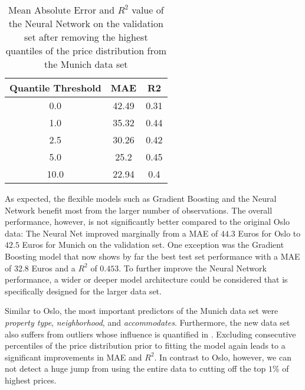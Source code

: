\begin{table}[t]
  \centering
  \begin{tabular}{@{}ccc@{}}
    \toprule
    Quantile Threshold & MAE   & R2   \\ \midrule
    0.0                & 42.49 & 0.31 \\
    1.0                & 35.32 & 0.44 \\
    2.5                & 30.26 & 0.42 \\
    5.0                & 25.2  & 0.45 \\
    10.0               & 22.94 & 0.4  \\ \bottomrule
  \end{tabular}
  \caption{Mean Absolute Error and $R^2$ value of the Neural Network on the validation set after removing the highest quantiles of the price distribution from the Munich data set}
  \label{tab:munich-outliers}
\end{table}

As expected, the flexible models such as Gradient Boosting and the Neural Network benefit most from the larger number of observations.
The overall performance, however, is not significantly better compared to the original Oslo data:
The Neural Net improved marginally from a MAE of $44.3$ Euros for Oslo to $42.5$ Euros for Munich on the validation set.
One exception was the Gradient Boosting model that now shows by far the best test set performance with a MAE of $32.8$ Euros and a $R^2$ of $0.453$.
To further improve the Neural Network performance, a wider or deeper model architecture could be considered that is specifically designed for the larger data set.

Similar to Oslo, the most important predictors of the Munich data set were \emph{property type}, \emph{neighborhood}, and \emph{accommodates}.
Furthermore, the new data set also suffers from outliers whose influence is quantified in .
Excluding consecutive percentiles of the price distribution prior to fitting the model again leads to a significant improvements in MAE and $R^2$.
In contrast to Oslo, however, we can not detect a huge jump from using the entire data to cutting off the top $1$\% of highest prices.









